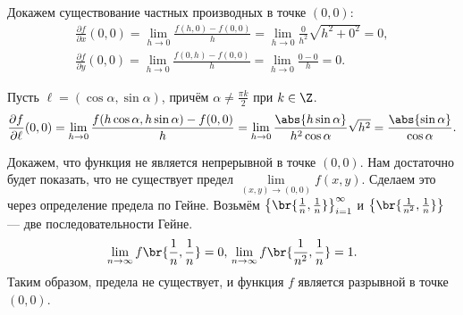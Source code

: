 \begin{solution}
    Докажем существование частных производных в точке $(0, 0)$:
    \begin{gather*}
        \frac{\partial f}{\partial x}(0, 0) = \lim_{h \to 0}\frac{f(h, 0) - f(0, 0)}{h} = \lim_{h \to 0}\frac{0}{h^2}\sqrt{h^2 + 0^2} = 0,\\
        \frac{\partial f}{\partial y}(0, 0) = \lim_{h \to 0}\frac{f(0, h) - f(0, 0)}{h} = \lim_{h \to 0}\frac{0 - 0}{h} = 0.
    \end{gather*}

    Пусть $\ell = (\cos\alpha, \sin\alpha)$, причём $\alpha \ne \frac{\pi k}{2}$ при $k \in \Z$.
    \[
        \frac{\partial f}{\partial \ell}(0, 0) = \lim_{h \to 0}\frac{f(h\cos\alpha, h\sin\alpha) - f(0, 0)}{h} = \lim_{h \to 0}\frac{\abs{h\sin\alpha}}{h^2\cos\alpha}\sqrt{h^2} = \frac{\abs{\sin\alpha}}{\cos\alpha}.
    \]

    Докажем, что функция не является непрерывной в точке $(0, 0)$. Нам достаточно будет показать, что не существует предел $\lim\limits_{(x, y) \to (0, 0)}f(x, y)$. Сделаем это через определение предела по Гейне. Возьмём $\left\{\br{\frac{1}{n}, \frac{1}{n}}\right\}_{i = 1}^\infty$ и $\left\{\br{\frac{1}{n^2}, \frac{1}{n}}\right\}$ --- две последовательности Гейне.
    \[
        \lim_{n \to \infty}f\br{\frac{1}{n}, \frac{1}{n}} = 0,\\
        \lim_{n \to \infty}f\br{\frac{1}{n^2}, \frac{1}{n}} = 1.
    \]
    Таким образом, предела не существует, и функция $f$ является разрывной в точке $(0, 0)$.
\end{solution}

